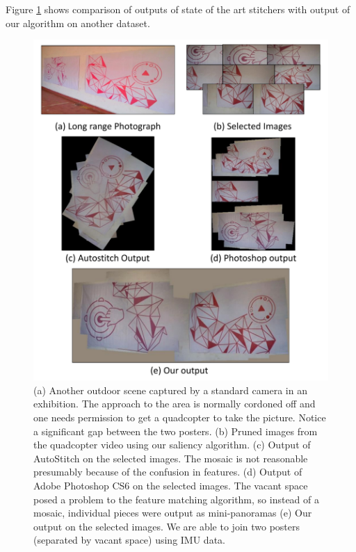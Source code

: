Figure \ref{fig:results2} shows comparison of outputs of state of the art
stitchers with output of our algorithm on another dataset.

\begin{figure}[h!]
\centering
\includegraphics[width=\linewidth]{figures/vacantSpaces/Purple_red} 
\caption[Result: Outdoor
Exhibition 2]{(a) Another outdoor
scene captured by a standard camera in an exhibition. The approach to the area is normally cordoned off and one
  needs permission to get a quadcopter to take the picture.  Notice a
  significant gap between the two posters.  (b) Pruned images from the
  quadcopter video using our saliency algorithm. (c) Output of
  AutoStitch on the selected images. The mosaic is not reasonable
  presumably because of the confusion in features. (d) Output of Adobe
  Photoshop CS6 on the selected images. The vacant space posed a
  problem to the feature matching algorithm, so instead of a mosaic,
  individual pieces were output as mini-panoramas (e) Our output on
  the selected images. We are able to join two posters (separated by
  vacant space) using IMU data.}
\label{fig:results2}
\end{figure}


